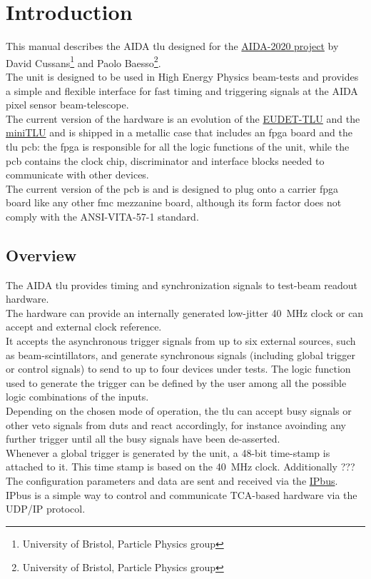 \chapter{Introduction}\label{ch:introduction}
This manual describes the AIDA \gls{tlu} designed for the \href{http://aida2020.web.cern.ch/}{AIDA-2020 project} by David Cussans\footnote{University of Bristol, Particle Physics group} and Paolo Baesso\footnote{University of Bristol, Particle Physics group}.\\
The unit is designed to be used in High Energy Physics beam-tests and provides a simple and flexible interface for fast timing and triggering signals at the AIDA pixel sensor beam-telescope.\\
The current version of the hardware is an evolution of the \href{https://twiki.cern.ch/twiki/bin/view/MimosaTelescope/TLU}{EUDET-TLU} and the \href{https://www.ohwr.org/projects/fmc-mtlu/wiki}{miniTLU} and is shipped in a metallic case that includes an \gls{fpga} board and the \gls{tlu} \gls{pcb}: the \gls{fpga} is responsible for all the logic functions of the unit, while the \gls{pcb} contains the clock chip, discriminator and interface blocks needed to communicate with other devices.\\
The current version of the \gls{pcb} is \brd and is designed to plug onto a carrier \gls{fpga} board like any other \gls{fmc} mezzanine board, although its form factor does not comply with the ANSI-VITA-57-1 standard.\\

\section{Overview}
The AIDA \gls{tlu} provides timing and synchronization signals to test-beam readout hardware.\\
The hardware can provide an internally generated low-jitter 40~MHz clock or can accept and external clock reference.\\
It accepts the asynchronous trigger signals from up to six external sources, such as beam-scintillators, and generate synchronous signals (including global trigger or control signals) to send to up to four devices under tests. The logic function used to generate the trigger can be defined by the user among all the possible logic combinations of the inputs.\\
Depending on the chosen mode of operation, the \gls{tlu} can accept busy signals or other veto signals from \gls{dut}s and react accordingly, for instance avoinding any further trigger until all the busy signals have been de-asserted.\\
Whenever a global trigger is generated by the unit, a 48-bit time-stamp is attached to it. This time stamp is based on the 40~MHz clock. Additionally ???\\
The configuration parameters and data are sent and received via the \href{https://www.ohwr.org/projects/ipbus}{IPbus}. IPbus is a simple way to control and communicate TCA-based hardware via the UDP/IP protocol.


